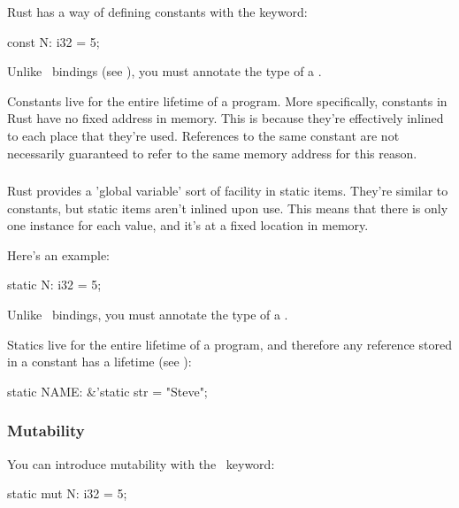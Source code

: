 Rust has a way of defining constants with the  keyword:

\begin{rustc}
const N: i32 = 5;
\end{rustc}

Unlike \keylet\ bindings (see ), you must annotate the type of a .

\blank

Constants live for the entire lifetime of a program. More specifically, constants in Rust have no fixed address in memory. This 
is because they're effectively inlined to each place that they're used. References to the same constant are not necessarily guaranteed 
to refer to the same memory address for this reason.

\subsubsection*{}
\label{paragraph:static}

Rust provides a 'global variable' sort of facility in static items. They're similar to constants, but static items aren't inlined upon 
use. This means that there is only one instance for each value, and it's at a fixed location in memory.

\blank

Here's an example:

\begin{rustc}
static N: i32 = 5;
\end{rustc}

Unlike \keylet\ bindings, you must annotate the type of a .

\blank

Statics live for the entire lifetime of a program, and therefore any reference stored in a constant has a  lifetime
(see ):

\begin{rustc}
static NAME: &'static str = "Steve";
\end{rustc}

\subsubsection*{Mutability}

You can introduce mutability with the \mut\ keyword:

\begin{rustc}
static mut N: i32 = 5;
\end{rustc}


